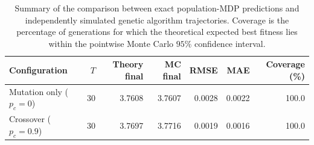 \begin{table}[t]
    \centering
    \caption{Summary of the comparison between exact population-MDP predictions and independently simulated genetic algorithm trajectories. Coverage is the percentage of generations for which the theoretical expected best fitness lies within the pointwise Monte Carlo $95\%$ confidence interval.}
    \label{tab:combined-ga-trajectory-summary}
    \begin{tabular}{lrrrrrr}
        \hline
        \textbf{Configuration} & \textbf{$T$} & \textbf{Theory final} & \textbf{MC final} & \textbf{RMSE} & \textbf{MAE} & \textbf{Coverage (\%)} \\
        \hline
        Mutation only ($p_c=0$) & 30 & 3.7608 & 3.7607 & 0.0028 & 0.0022 & 100.0 \\
        Crossover ($p_c=0.9$) & 30 & 3.7697 & 3.7716 & 0.0019 & 0.0016 & 100.0 \\
        \hline
    \end{tabular}
\end{table}
